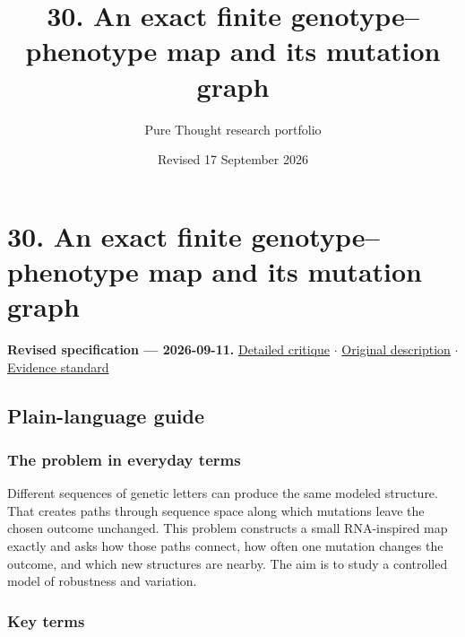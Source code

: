 \documentclass[
  11pt,
]{article}
\title{30. An exact finite genotype--phenotype map and its mutation
graph}
\author{Pure Thought research portfolio}
\date{Revised 17 September 2026}
\begin{document}
\maketitle
\thispagestyle{empty}
\clearpage

\section{30. An exact finite genotype--phenotype map and its mutation
graph}

\textbf{Revised specification --- 2026-09-11.}
\href{https://github.com/rick-stevens-ai/Pure-Thought/blob/main/reviews/30-Genotype-Phenotype-Mapping.md}{Detailed
critique} \ensuremath{\cdot}
\href{https://github.com/rick-stevens-ai/Pure-Thought/blob/main/archive/original-PRDs/30-Genotype-Phenotype-Mapping.md}{Original
description} \ensuremath{\cdot}
\href{https://github.com/rick-stevens-ai/Pure-Thought/blob/main/reviews/EVIDENCE-STANDARD.md}{Evidence
standard}

\subsection{Plain-language guide}

\subsubsection{The problem in everyday terms}

Different sequences of genetic letters can produce the same modeled
structure. That creates paths through sequence space along which
mutations leave the chosen outcome unchanged. This problem constructs a
small RNA-inspired map exactly and asks how those paths connect, how
often one mutation changes the outcome, and which new structures are
nearby. The aim is to study a controlled model of robustness and
variation.

\subsubsection{Key terms}
\end{document}
